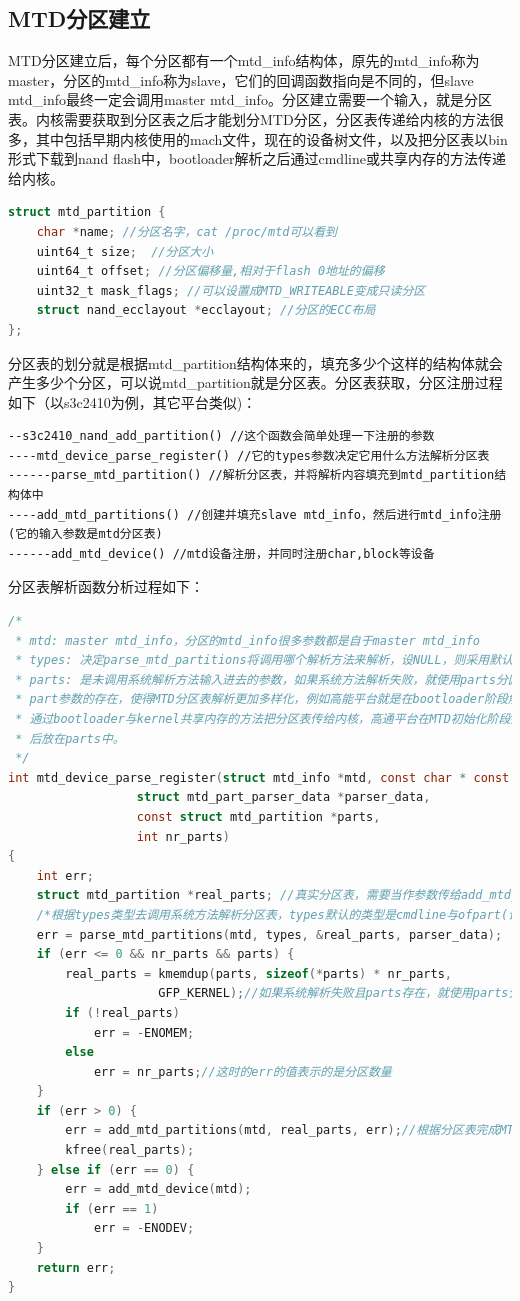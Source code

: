 \subsection{MTD分区建立}
MTD分区建立后，每个分区都有一个mtd\_info结构体，原先的mtd\_info称为master，分区的mtd\_info称为slave，它们的回调函数指向是不同的，但slave mtd\_info最终一定会调用master mtd\_info。分区建立需要一个输入，就是分区表。内核需要获取到分区表之后才能划分MTD分区，分区表传递给内核的方法很多，其中包括早期内核使用的mach文件，现在的设备树文件，以及把分区表以bin形式下载到nand flash中，bootloader解析之后通过cmdline或共享内存的方法传递给内核。
\begin{lstlisting}[language=C]
struct mtd_partition {
	char *name; //分区名字，cat /proc/mtd可以看到
	uint64_t size;	//分区大小
	uint64_t offset; //分区偏移量,相对于flash 0地址的偏移
	uint32_t mask_flags; //可以设置成MTD_WRITEABLE变成只读分区
	struct nand_ecclayout *ecclayout; //分区的ECC布局
};
\end{lstlisting}
分区表的划分就是根据mtd\_partition结构体来的，填充多少个这样的结构体就会产生多少个分区，可以说mtd\_partition就是分区表。分区表获取，分区注册过程如下（以s3c2410为例，其它平台类似)：
\begin{mdframed}[style=leftredline]
\begin{verbatim}
--s3c2410_nand_add_partition() //这个函数会简单处理一下注册的参数
----mtd_device_parse_register() //它的types参数决定它用什么方法解析分区表
------parse_mtd_partition() //解析分区表，并将解析内容填充到mtd_partition结构体中
----add_mtd_partitions() //创建并填充slave mtd_info，然后进行mtd_info注册(它的输入参数是mtd分区表)
------add_mtd_device() //mtd设备注册，并同时注册char,block等设备
\end{verbatim}
\end{mdframed}
分区表解析函数分析过程如下：
\begin{lstlisting}[language=C]
/*
 * mtd: master mtd_info，分区的mtd_info很多参数都是自于master mtd_info
 * types: 决定parse_mtd_partitions将调用哪个解析方法来解析，设NULL，则采用默认参数
 * parts: 是未调用系统解析方法输入进去的参数，如果系统方法解析失败，就使用parts分区表。
 * part参数的存在，使得MTD分区表解析更加多样化，例如高能平台就是在bootloader阶段解析后
 * 通过bootloader与kernel共享内存的方法把分区表传给内核，高通平台在MTD初始化阶段把它解析
 * 后放在parts中。
 */
int mtd_device_parse_register(struct mtd_info *mtd, const char * const *types,
			      struct mtd_part_parser_data *parser_data,
			      const struct mtd_partition *parts,
			      int nr_parts)
{
	int err;
	struct mtd_partition *real_parts; //真实分区表，需要当作参数传给add_mtd_partitions
	/*根据types类型去调用系统方法解析分区表，types默认的类型是cmdline与ofpart(设备树)*/
	err = parse_mtd_partitions(mtd, types, &real_parts, parser_data);
	if (err <= 0 && nr_parts && parts) {
		real_parts = kmemdup(parts, sizeof(*parts) * nr_parts,
				     GFP_KERNEL);//如果系统解析失败且parts存在，就使用parts分区表
		if (!real_parts)
			err = -ENOMEM;
		else
			err = nr_parts;//这时的err的值表示的是分区数量
	}
	if (err > 0) {
		err = add_mtd_partitions(mtd, real_parts, err);//根据分区表完成MTD分区注册
		kfree(real_parts);
	} else if (err == 0) {
		err = add_mtd_device(mtd);
		if (err == 1)
			err = -ENODEV;
	}
	return err;
}
\end{lstlisting}

